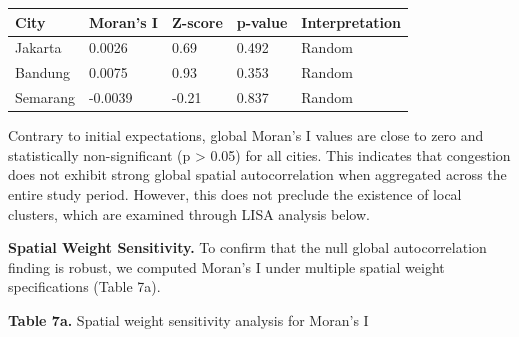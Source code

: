 \documentclass[12pt,a4paper]{article}
\begin{document}
\begin{longtable}[]{@{}lllll@{}}
\toprule\noalign{}
City & Moran's I & Z-score & p-value & Interpretation \\
\midrule\noalign{}
\endhead
\bottomrule\noalign{}
\endlastfoot
Jakarta & 0.0026 & 0.69 & 0.492 & Random \\
Bandung & 0.0075 & 0.93 & 0.353 & Random \\
Semarang & -0.0039 & -0.21 & 0.837 & Random \\
\end{longtable}

Contrary to initial expectations, global Moran's I values are close to zero and statistically non-significant (p > 0.05) for all cities. This indicates that congestion does not exhibit strong global spatial autocorrelation when aggregated across the entire study period. However, this does not preclude the existence of local clusters, which are examined through LISA analysis below.

\textbf{Spatial Weight Sensitivity.} To confirm that the null global autocorrelation finding is robust, we computed Moran's I under multiple spatial weight specifications (Table 7a).

\textbf{Table 7a.} Spatial weight sensitivity analysis for Moran's I
\end{document}
